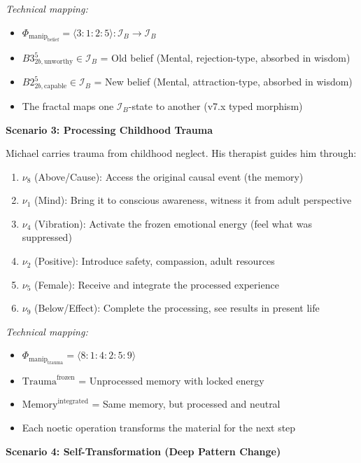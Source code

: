 \documentclass[11pt,twoside]{book}
\newcommand{\noe}[1]{\nu_{#1}}
\newcommand{\Ideas}{\mathcal{I}}
\newcommand{\ManipFrac}{\Phi_{\mathrm{manip}}}
\newcommand{\IdeasB}{\Ideas_B}     %
\begin{document}
\begin{tcolorbox}[colback=yellow!5!white,colframe=yellow!65!black,title=\textbf{Real-Life Scenarios: Manipulation Fractals},breakable]
\textit{Technical mapping:}
\begin{itemize}
    \item $\ManipFrac_{\mathrm{belief}} = \langle 3:1:2:5 \rangle : \IdeasB \to \IdeasB$
    \item $B3^5_{2b,\text{unworthy}} \in \IdeasB$ = Old belief (Mental, rejection-type, absorbed in wisdom)
    \item $B2^5_{2b,\text{capable}} \in \IdeasB$ = New belief (Mental, attraction-type, absorbed in wisdom)
    \item The fractal maps one $\IdeasB$-state to another (v7.x typed morphism)
\end{itemize}

\textbf{Scenario 3: Processing Childhood Trauma}

Michael carries trauma from childhood neglect. His therapist guides him through:
\begin{enumerate}
    \item $\noe{8}$ (Above/Cause): Access the original causal event (the memory)
    \item $\noe{1}$ (Mind): Bring it to conscious awareness, witness it from adult perspective
    \item $\noe{4}$ (Vibration): Activate the frozen emotional energy (feel what was suppressed)
    \item $\noe{2}$ (Positive): Introduce safety, compassion, adult resources
    \item $\noe{5}$ (Female): Receive and integrate the processed experience
    \item $\noe{9}$ (Below/Effect): Complete the processing, see results in present life
\end{enumerate}

\textit{Technical mapping:}
\begin{itemize}
    \item $\ManipFrac_{\mathrm{trauma}} = \langle 8:1:4:2:5:9 \rangle$
    \item $\mathrm{Trauma}^{\mathrm{frozen}}$ = Unprocessed memory with locked energy
    \item $\mathrm{Memory}^{\mathrm{integrated}}$ = Same memory, but processed and neutral
    \item Each noetic operation transforms the material for the next step
\end{itemize}

\textbf{Scenario 4: Self-Transformation (Deep Pattern Change)}


\end{tcolorbox}
\end{document}
